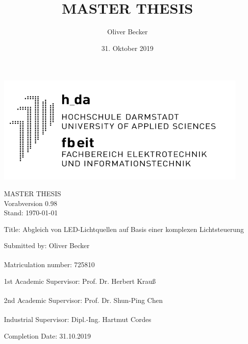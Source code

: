 \documentclass[11pt]{scrartcl}
\title{MASTER THESIS}
\author{Oliver Becker}
\date{31. Oktober 2019} %
\begin{document}
\par\vspace{-1cm}
\begin{flushright}
    \includegraphics[width=0.4\linewidth]{images/logo.png}
\end{flushright}
\vspace{1cm}\noindent
\begin{center}
    \huge MASTER THESIS\\
    \huge \color{red} Vorabversion 0.98\\
    \large Stand: \today
\end{center}
\vspace{1cm}\noindent
{\large Title:  Abgleich von LED-Lichtquellen auf Basis einer komplexen Lichtsteuerung}
\par\vspace{3cm}\noindent
Submitted by: \hspace{2cm}             Oliver Becker\\
\\
Matriculation number:  \hspace{.6cm}   725810\\
\par\vspace{2cm}\noindent
1st Academic Supervisor: \hspace{.2cm} Prof. Dr. Herbert Krauß\\
\\
2nd Academic Supervisor: \hspace{.05cm} Prof. Dr. Shun-Ping Chen\\
\\
Industrial Supervisor:   \hspace{.75cm} Dipl.-Ing. Hartmut Cordes\\
\par\vspace{2cm}\noindent
Completion Date: \hspace{1.5cm}         31.10.2019
\clearpage
\end{document}
